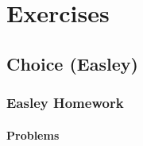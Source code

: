 \documentclass[12pt]{article}
\begin{document}
\newpage
\section{Exercises}\label{sec:exercises}

\subsection{Choice (Easley)}

\subsubsection{Easley Homework}

\paragraph{Problems}
\end{document}
